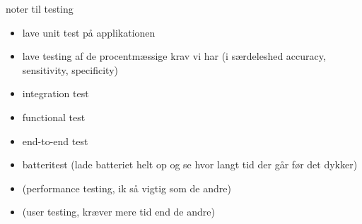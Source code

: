 noter til testing
\begin{itemize}
    \item lave unit test på applikationen
    \item lave testing af de procentmæssige krav vi har (i særdeleshed accuracy, sensitivity, specificity)
    \item integration test
    \item functional test
    \item end-to-end test
    \item batteritest (lade batteriet helt op og se hvor langt tid der går før det dykker)
    \item (performance testing, ik så vigtig som de andre)
    \item (user testing, kræver mere tid end de andre)

\end{itemize}